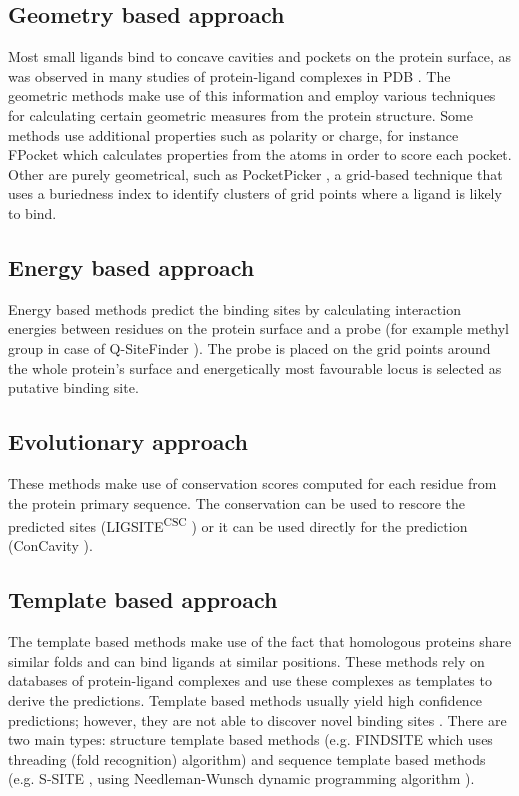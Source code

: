 \subsection{Geometry based approach}
Most small ligands bind to concave cavities and pockets on the protein surface, as was observed in many studies of protein-ligand complexes in PDB \cite{methods}. The geometric methods make use of this information and employ various techniques for calculating certain geometric measures from the protein structure. Some methods use additional properties such as polarity or charge, for instance FPocket \cite{fpocket} which calculates properties from the atoms in order to score each pocket. Other are purely geometrical, such as PocketPicker \cite{pocketpicker}, a grid-based technique that uses a buriedness index to identify clusters of grid points where a ligand is likely to bind.

\subsection{Energy based approach}
Energy based methods predict the binding sites by calculating interaction energies between residues on the protein surface and a probe (for example methyl group in case of Q-SiteFinder \cite{qsitefinder}). The probe is placed on the grid points around the whole protein's surface and energetically most favourable locus is selected as putative binding site.

\subsection{Evolutionary approach}
These methods make use of conservation scores computed for each residue from the protein primary sequence. The conservation can be used to rescore the predicted sites (LIGSITE\textsuperscript{CSC} \cite{ligsite}) or it can be used directly for the prediction (ConCavity \cite{concavity}).

\subsection{Template based approach}
The template based methods make use of the fact that homologous proteins share similar folds and can bind ligands at similar positions. These methods rely on databases of protein-ligand complexes and use these complexes as templates to derive the predictions. Template based methods usually yield high confidence predictions; however, they are not able to discover novel binding sites \cite{p2rank1}. There are two main types: structure template based methods (e.g. FINDSITE \cite{findsite} which uses threading (fold recognition) algorithm) and sequence template based methods (e.g. S-SITE \cite{coach}, using Needleman-Wunsch dynamic programming algorithm \cite{needleman}).

